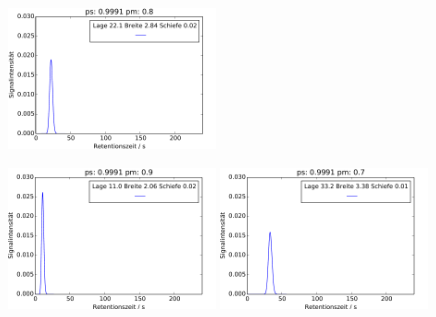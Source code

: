 \begin{figure}[H]
\begin{center}
\includegraphics[width=0.49\textwidth]{bilder/2s_einzeleinfluss/2s_t20}
\end{center}
\includegraphics[width=0.49\textwidth]{bilder/2s_einzeleinfluss/2s_t20_pmp}
\includegraphics[width=0.49\textwidth]{bilder/2s_einzeleinfluss/2s_t20_pmm}

\vspace*{5pt}


\end{figure}
